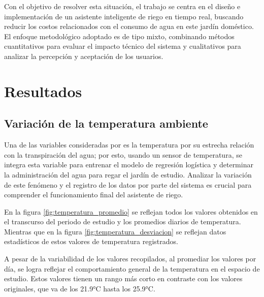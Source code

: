 \documentclass[pdflatex,sn-mathphys-num]{sn-jnl}%
\theoremstyle{thmstyleone}%
\theoremstyle{thmstyletwo}%
\theoremstyle{thmstylethree}%
\begin{document}
\begin{multicols}{2}
Con el objetivo de resolver esta situación, el trabajo se centra en el diseño e implementación de un asistente inteligente de riego en tiempo real, buscando reducir los costos relacionados con el consumo de agua en este jardín doméstico. El enfoque metodológico adoptado es de tipo mixto, combinando métodos cuantitativos para evaluar el impacto técnico del sistema y cualitativos para analizar la percepción y aceptación de los usuarios.
\section*{Resultados}\label{sec2}
\subsection*{Variación de la temperatura ambiente}
Una de las variables consideradas por \cite{ref12} es la temperatura por su estrecha relación con la transpiración del agua; por esto, usando un sensor de temperatura, se integra esta variable para entrenar el modelo de regresión logística y determinar la administración del agua para regar el jardín de estudio. Analizar la variación de este fenómeno y el registro de los datos por parte del sistema es crucial para comprender el funcionamiento final del asistente de riego.

En la figura \ref{fig:temperatura_promedio} se reflejan todos los valores obtenidos en el transcurso del periodo de estudio y los promedios diarios de temperatura. Mientras que en la figura \ref{fig:temperatura_desviacion} se reflejan datos estadísticos de estos valores de temperatura registrados. 

A pesar de la variabilidad de los valores recopilados, al promediar los valores por día, se logra reflejar el comportamiento general de la temperatura en el espacio de estudio. Estos valores tienen un rango más corto en contraste con los valores originales, que va de los 21.9°C hasta los 25.9°C.


    
\end{multicols}
\end{document}
